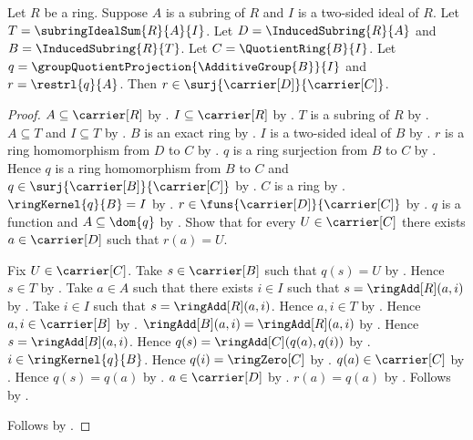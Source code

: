 \begin{theorem}\label{ring_second_isomorphism_restriction_surjective}
    Let $R$ be a ring.
    Suppose $A$ is a subring of $R$ and
        $I$ is a two-sided ideal of $R$.
    Let $T=\subringIdealSum{R}{A}{I}$.
    Let $D=\InducedSubring{R}{A}$ and $B=\InducedSubring{R}{T}$.
    Let $C=\QuotientRing{B}{I}$.
    Let $q=\groupQuotientProjection{\AdditiveGroup{B}}{I}$ and
        $r=\restrl{q}{A}$.
    Then $r\in\surj{\carrier[D]}{\carrier[C]}$.
\end{theorem}
\begin{proof}
    $A\subseteq\carrier[R]$ by .
    $I\subseteq\carrier[R]$ by
        .
    $T$ is a subring of $R$ by .
    $A\subseteq T$ and $I\subseteq T$ by
        .
    $B$ is an exact ring by .
    $I$ is a two-sided ideal of $B$ by
        .
    $r$ is a ring homomorphism from $D$ to $C$ by
        .
    $q$ is a ring surjection from $B$ to $C$ by
        .
    Hence $q$ is a ring homomorphism from $B$ to $C$ and
        $q\in\surj{\carrier[B]}{\carrier[C]}$ by
        .
    $C$ is a ring by .
    $\ringKernel{q}{B}=I$ by
        .
    $r\in\funs{\carrier[D]}{\carrier[C]}$ by
        .
    $q$ is a function and $A\subseteq\dom{q}$ by
        .
    Show that for every $U\in\carrier[C]$ there exists
        $a\in\carrier[D]$ such that $r(a)=U$.
    \begin{subproof}
        Fix $U\in\carrier[C]$.
        Take $s\in\carrier[B]$ such that $q(s)=U$ by .
        Hence $s\in T$ by .
        Take $a\in A$ such that there exists $i\in I$ such that
            $s=\ringAdd[R](a,i)$ by .
        Take $i\in I$ such that $s=\ringAdd[R](a,i)$.
        Hence $a,i\in T$ by .
        Hence $a,i\in\carrier[B]$ by
            .
        $\ringAdd[B](a,i)=\ringAdd[R](a,i)$ by
            .
        Hence $s=\ringAdd[B](a,i)$.
        Hence $q(s)=\ringAdd[C](q(a),q(i))$ by
            .
        $i\in\ringKernel{q}{B}$.
        Hence $q(i)=\ringZero[C]$ by .
        $q(a)\in\carrier[C]$ by .
        Hence $q(s)=q(a)$ by .
        $a\in\carrier[D]$ by .
        $r(a)=q(a)$ by .
        Follows by \auto.
    \end{subproof}
    Follows by .
\end{proof}

